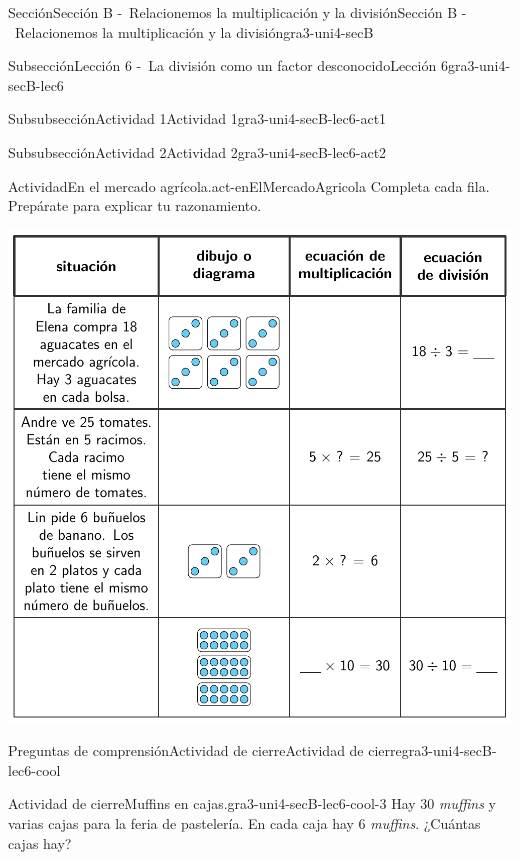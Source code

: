 \documentclass[twoside,10pt,]{article}
\begin{document}
\begin{sectionptx}{Sección}{Sección B -~Relacionemos la multiplicación y la división}{}{Sección B -~Relacionemos la multiplicación y la división}{}{}{gra3-uni4-secB}
\begin{subsectionptx}{Subsección}{Lección 6 -~La división como un factor desconocido}{}{Lección 6}{}{}{gra3-uni4-secB-lec6}
\begin{subsubsectionptx}{Subsubsección}{Actividad 1}{}{Actividad 1}{}{}{gra3-uni4-secB-lec6-act1}
\end{subsubsectionptx}
%
%
\typeout{************************************************}
\typeout{************************************************}
%
\begin{subsubsectionptx}{Subsubsección}{Actividad 2}{}{Actividad 2}{}{}{gra3-uni4-secB-lec6-act2}
\begin{activity}{Actividad}{En el mercado agrícola.}{act-enElMercadoAgricola}%
Completa cada fila. Prepárate para explicar tu razonamiento.%
\begin{image}{0}{1}{0}{}%
\includegraphics[width=\linewidth]{external/tikz-source/enElMercadoAgricola-tab.pdf}
\end{image}%
\end{activity}%
\end{subsubsectionptx}
%
%
\typeout{************************************************}
\typeout{************************************************}
%
\begin{reading-questions-subsubsection}{Preguntas de comprensión}{Actividad de cierre}{}{Actividad de cierre}{}{}{gra3-uni4-secB-lec6-cool}
\begin{project}{Actividad de cierre}{Muffins en cajas.}{gra3-uni4-secB-lec6-cool-3}%
Hay 30 \emph{muffins} y varias cajas para la feria de pastelería. En cada caja hay 6 \emph{muffins}. ¿Cuántas cajas hay?%

\end{project}
\end{reading-questions-subsubsection}
\end{subsectionptx}
\end{sectionptx}
\end{document}
